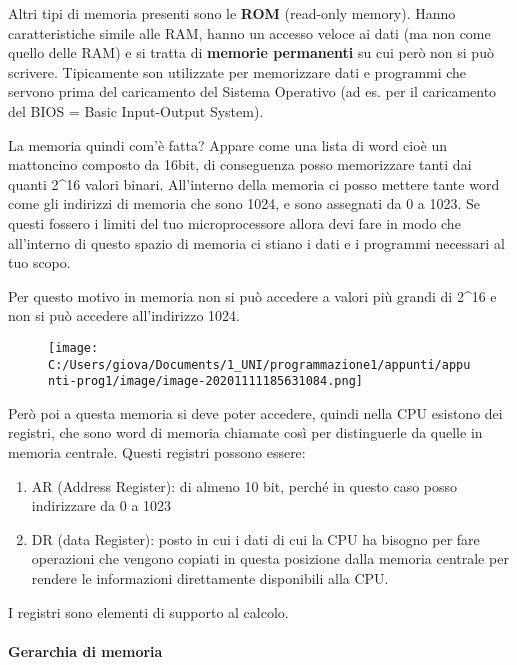 \documentclass[
]{article}
\begin{document}
Altri tipi di memoria presenti sono le \textbf{ROM} (read-only memory).
Hanno caratteristiche simile alle RAM, hanno un accesso veloce ai dati
(ma non come quello delle RAM) e si tratta di \textbf{memorie
permanenti} su cui però non si può scrivere. Tipicamente son utilizzate
per memorizzare dati e programmi che servono prima del caricamento del
Sistema Operativo (ad es. per il caricamento del BIOS = Basic
Input-Output System).

La memoria quindi com'è fatta? Appare come una lista di word cioè un
mattoncino composto da 16bit, di conseguenza posso memorizzare tanti dai
quanti 2\^{}16 valori binari. All'interno della memoria ci posso mettere
tante word come gli indirizzi di memoria che sono 1024, e sono assegnati
da 0 a 1023. Se questi fossero i limiti del tuo microprocessore allora
devi fare in modo che all'interno di questo spazio di memoria ci stiano
i dati e i programmi necessari al tuo scopo.

Per questo motivo in memoria non si può accedere a valori più grandi di
2\^{}16 e non si può accedere all'indirizzo 1024.

\begin{figure}
\centering
\texttt{[image: C:/Users/giova/Documents/1\_UNI/programmazione1/appunti/appunti-prog1/image/image-20201111185631084.png]}
\caption{}
\end{figure}

Però poi a questa memoria si deve poter accedere, quindi nella CPU
esistono dei registri, che sono word di memoria chiamate così per
distinguerle da quelle in memoria centrale. Questi registri possono
essere:

\begin{enumerate}
\def\labelenumi{\arabic{enumi}.}
\item
  AR (Address Register): di almeno 10 bit, perché in questo caso posso
  indirizzare da 0 a 1023
\item
  DR (data Register): posto in cui i dati di cui la CPU ha bisogno per
  fare operazioni che vengono copiati in questa posizione dalla memoria
  centrale per rendere le informazioni direttamente disponibili alla
  CPU.
\end{enumerate}

I registri sono elementi di supporto al calcolo.

\hypertarget{header-n162}{%
\paragraph{Gerarchia di memoria}\label{header-n162}}
\end{document}
